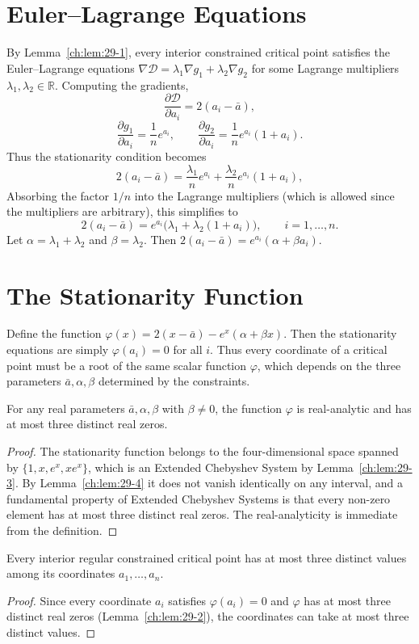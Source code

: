 \section{Euler--Lagrange Equations}\label{ch:sec:euler--lagrange-equations}
By Lemma~\ref{ch:lem:29-1}, every interior constrained critical point satisfies the Euler--Lagrange equations
$\nabla\mathcal D = \lambda_1\nabla g_1 + \lambda_2\nabla g_2$
for some Lagrange multipliers \(\lambda_1,\lambda_2\in\mathbb R\).
Computing the gradients,
\[
\frac{\partial\mathcal D}{\partial a_i}
=
2(a_i-\bar a),
\]
\[
\frac{\partial g_1}{\partial a_i}
=
\frac{1}{n}e^{a_i},
\qquad
\frac{\partial g_2}{\partial a_i}
=
\frac{1}{n}e^{a_i}(1+a_i).
\]
Thus the stationarity condition becomes
\[
2(a_i-\bar a)
=
\frac{\lambda_1}{n}e^{a_i}
+
\frac{\lambda_2}{n}e^{a_i}(1+a_i),
\]
Absorbing the factor \(1/n\) into the Lagrange multipliers
(which is allowed since the multipliers are arbitrary),
this simplifies to
\[
2(a_i-\bar a) = e^{a_i}\bigl(\lambda_1 + \lambda_2(1+a_i)\bigr),\qquad i=1,\ldots,n.
\]
Let \(\alpha = \lambda_1+\lambda_2\) and \(\beta = \lambda_2\). Then
$2(a_i-\bar a) = e^{a_i}(\alpha + \beta a_i).$
\section{The Stationarity Function}\label{ch:sec:the-stationarity-function}
Define the function
$\varphi(x) = 2(x-\bar a) - e^{x}(\alpha + \beta x).$
Then the stationarity equations are simply \(\varphi(a_i)=0\) for all \(i\).
Thus every coordinate of a critical point must be a root of the same scalar function \(\varphi\), which depends on the three parameters \(\bar a,\alpha,\beta\) determined by the constraints.
\begin{lemma}
\label{ch:lem:29-2}
For any real parameters \(\bar a,\alpha,\beta\) with \(\beta\neq0\), the function \(\varphi\) is real-analytic and has at most three distinct real zeros.
\end{lemma}
\begin{proof}
The stationarity function belongs to the four-dimensional space spanned
by \(\{1,x,e^x,xe^x\}\), which is an Extended Chebyshev System by
Lemma~\ref{ch:lem:29-3}.  By Lemma~\ref{ch:lem:29-4} it does not vanish
identically on any interval, and a fundamental property of Extended
Chebyshev Systems is that every non-zero element has at most three
distinct real zeros.  The real-analyticity is immediate from the
definition. 
\end{proof}
\begin{corollary}
\label{ch:cor:29-1}
Every interior regular constrained critical point has at most three distinct values among its coordinates \(a_1,\ldots,a_n\).
\end{corollary}
\begin{proof}
Since every coordinate \(a_i\) satisfies \(\varphi(a_i)=0\) and \(\varphi\) has at most three distinct real zeros (Lemma~\ref{ch:lem:29-2}), the coordinates can take at most three distinct values. 
\end{proof}
